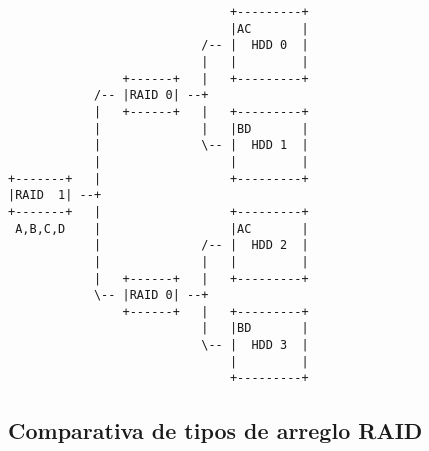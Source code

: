 \begin{itemize}
{
\scriptsize
\linespread{1}
\begin{verbatim}
                               +---------+
                               |AC       |
                           /-- |  HDD 0  |
                           |   |         |
                +------+   |   +---------+
            /-- |RAID 0| --+
            |   +------+   |   +---------+
            |              |   |BD       |
            |              \-- |  HDD 1  |
            |                  |         |
+-------+   |                  +---------+
|RAID  1| --+
+-------+   |                  +---------+
 A,B,C,D    |                  |AC       |
            |              /-- |  HDD 2  |
            |              |   |         |
            |   +------+   |   +---------+
            \-- |RAID 0| --+
                +------+   |   +---------+
                           |   |BD       |
                           \-- |  HDD 3  |
                               |         |
                               +---------+
\end{verbatim}
}
  
\end{itemize}

      \subsection {Comparativa de tipos de arreglo RAID}

